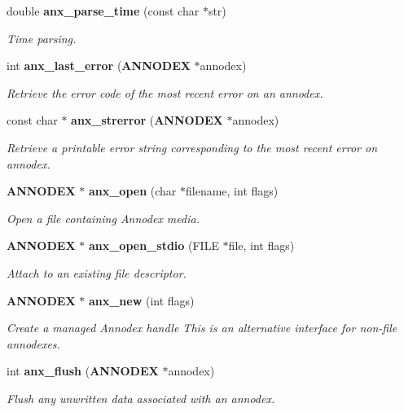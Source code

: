 \begin{CompactItemize}
\item 
double {\bf anx\_\-parse\_\-time} (const char $\ast$str)\label{anx__general_8h_a0}

\begin{CompactList}\small\item\em Time parsing. \item\end{CompactList}\item 
int {\bf anx\_\-last\_\-error} ({\bf ANNODEX} $\ast$annodex)
\begin{CompactList}\small\item\em Retrieve the error code of the most recent error on an annodex. \item\end{CompactList}\item 
const char $\ast$ {\bf anx\_\-strerror} ({\bf ANNODEX} $\ast$annodex)
\begin{CompactList}\small\item\em Retrieve a printable error string corresponding to the most recent error on annodex. \item\end{CompactList}\item 
{\bf ANNODEX} $\ast$ {\bf anx\_\-open} (char $\ast$filename, int flags)
\begin{CompactList}\small\item\em Open a file containing Annodex media. \item\end{CompactList}\item 
{\bf ANNODEX} $\ast$ {\bf anx\_\-open\_\-stdio} (FILE $\ast$file, int flags)
\begin{CompactList}\small\item\em Attach to an existing file descriptor. \item\end{CompactList}\item 
{\bf ANNODEX} $\ast$ {\bf anx\_\-new} (int flags)
\begin{CompactList}\small\item\em Create a managed Annodex handle This is an alternative interface for non-file annodexes. \item\end{CompactList}\item 
int {\bf anx\_\-flush} ({\bf ANNODEX} $\ast$annodex)
\begin{CompactList}\small\item\em Flush any unwritten data associated with an annodex. \item\end{CompactList}\item 

\end{CompactItemize}
